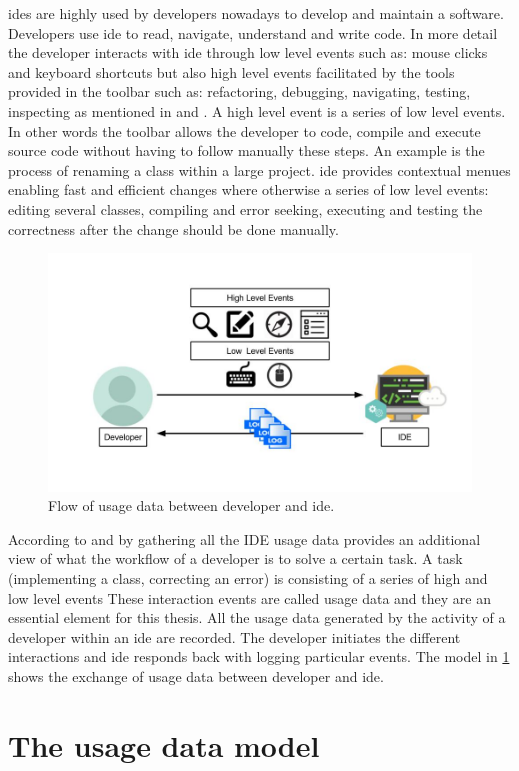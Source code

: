 \gls{ide}s are highly used by developers nowadays to develop and maintain a software. Developers use \gls{ide} to read, navigate, understand and write code. In more detail the developer interacts with \gls{ide} through low level events such as: mouse clicks and keyboard shortcuts but also high level events facilitated by the tools provided in the toolbar such as: refactoring, debugging, navigating, testing, inspecting as mentioned in 
and . 
A high level event is a series of low level events. In other words the toolbar allows the developer to code, compile and execute source code without having to follow manually these steps.  An example is the process of renaming a class within a large project. \gls{ide} provides contextual menues enabling fast and efficient changes where otherwise a series of low level events: editing several classes, compiling and error seeking, executing and testing the correctness after the change should be done manually.

	\begin{figure}[!ht]
		\begin{center}
		 
        \includegraphics[width=\textwidth]{figures/ch1a_dev_ide.jpg}
		\end{center}
		\caption{Flow of usage data between developer and \gls{ide}.}
		\label{fig:ch1a_dev_ide}
	\end{figure}

According to  and  by gathering all the IDE usage data provides an additional view of what the workflow of a developer is to solve a certain task.
A task (implementing a class, correcting an error) is consisting of a series of high and low level events  These interaction events are called usage data  and they are an essential element for this thesis. All the usage data generated by the activity of a developer within an \gls{ide} are recorded. The developer initiates the different interactions and \gls{ide} responds back with logging particular events. The model in \ref{fig:ch1a_dev_ide} shows the exchange of usage data between developer and \gls{ide}.

\section{The usage data model} 
